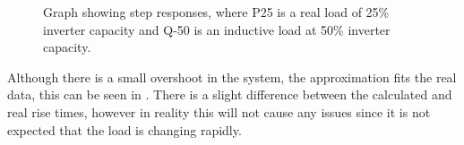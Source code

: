 \begin{figure}[H]
\centering

\caption{Graph showing step responses, where P25 is a real load of 25\% inverter capacity and Q-50 is an inductive load at 50\% inverter capacity.}\label{fig:inverter_data_main}
\end{figure}



Although there is a small overshoot in the system, the approximation fits the real data, this can be seen in . There is a slight difference between the calculated and real rise times, however in reality this will not cause any issues since it is not expected that the load is changing rapidly. 

